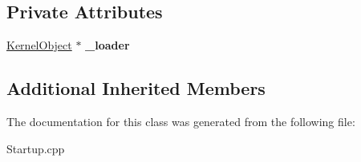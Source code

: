 \subsection*{Private Attributes}
\begin{DoxyCompactItemize}
\item 
\mbox{\label{class_startup___internal_1_1_waiting_for_image_afa7948fc6211d294a167243a2eebfbb3}} 
\hyperlink{class_kernel_object}{Kernel\+Object} $\ast$ {\bfseries \+\_\+loader}
\end{DoxyCompactItemize}
\subsection*{Additional Inherited Members}


The documentation for this class was generated from the following file\+:\begin{DoxyCompactItemize}
\item 
Startup.\+cpp\end{DoxyCompactItemize}
